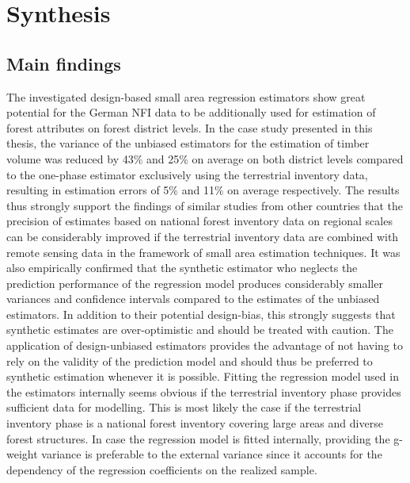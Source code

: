 	
\chapter{Synthesis}
\label{chap:synth}
\newpage



\section{Main findings}
\label{sec:synth:mainfind}


The investigated design-based small area regression estimators show great potential for the German NFI data to be additionally used for estimation of forest attributes on forest district levels. In the case study presented in this thesis, the variance of the unbiased estimators for the estimation of timber volume was reduced by 43\% and 25\% on average on both district levels compared to the one-phase estimator exclusively using the terrestrial inventory data, resulting in estimation errors of 5\% and 11\% on average respectively. The results thus strongly support the findings of similar studies from other countries that the precision of estimates based on national forest inventory data on regional scales can be considerably improved if the terrestrial inventory data are combined with remote sensing data in the framework of small area estimation techniques. It was also empirically confirmed that the synthetic estimator who neglects the prediction performance of the regression model produces considerably smaller variances and confidence intervals compared to the estimates of the unbiased estimators. In addition to their potential design-bias, this strongly suggests that synthetic estimates are over-optimistic and should be treated with caution. The application of design-unbiased estimators provides the advantage of not having to rely on the validity of the prediction model and should thus be preferred to synthetic estimation whenever it is possible. Fitting the regression model used in the estimators internally seems obvious if the terrestrial inventory phase provides sufficient data for modelling. This is most likely the case if the terrestrial inventory phase is a national forest inventory covering large areas and diverse forest structures. In case the regression model is fitted internally, providing the g-weight variance is preferable to the external variance since it accounts for the dependency of the regression coefficients on the realized sample.\par

